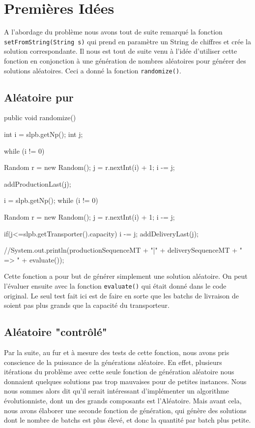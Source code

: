 \section{Premières Idées}
A l'abordage du problème nous avons tout de suite remarqué la fonction \verb!setFromString(String s)! qui prend en paramètre un String de chiffres et crée la solution correspondante. Il nous est tout de suite venu à l'idée d'utiliser cette fonction en conjonction à une génération de nombres aléatoires pour générer des solutions aléatoires. Ceci a donné la fonction \verb!randomize()!.

\subsection{Aléatoire pur}
\begin{java}
public void randomize() {
	int i = slpb.getNp();
	int j;

	while (i != 0) {
		Random r = new Random();
		j = r.nextInt(i) + 1;
		i -= j;
	
		addProductionLast(j);
	}

	i = slpb.getNp();
	while (i != 0) {
		Random r = new Random();
		j = r.nextInt(i) + 1;
		i -= j;
	
		if(j<=slpb.getTransporter().capacity) {
			i -= j;
			addDeliveryLast(j);
		}
	}
	//System.out.println(productionSequenceMT + "|" + deliverySequenceMT + " => " + evaluate());
}
\end{java}
\vspace{1em}
Cette fonction a pour but de générer simplement une solution aléatoire. On peut l'évaluer ensuite avec la fonction \verb!evaluate()! qui était donné dans le code original. Le seul test fait ici est de faire en sorte que les batchs de livraison de soient pas plus grands que la capacité du transporteur.
\vspace{2em}

\subsection{Aléatoire "contrôlé"}
Par la suite, au fur et à mesure des tests de cette fonction, nous avons pris conscience de la puissance de la générations aléatoire. En effet, plusieurs itérations du problème avec cette seule fonction de génération aléatoire nous donnaient quelques solutions pas trop mauvaises pour de petites instances. Nous nous sommes alors dit qu'il serait intéressant d'implémenter un algorithme évolutionniste, dont un des grands composants est l'Aléatoire. Mais avant cela, nous avons élaborer une seconde fonction de génération, qui génère des solutions dont le nombre de batchs est plus élevé, et donc la quantité par batch plus petite.

